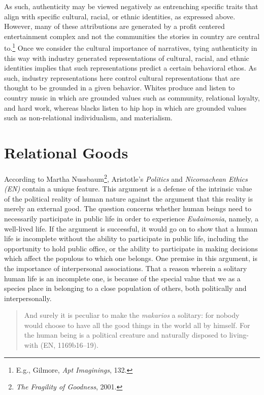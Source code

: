 \documentclass[phdthesis,12pt,final]{wuthesis}
\theoremstyle{definition}
\theoremstyle{definition}
\theoremstyle{definition}
\theoremstyle{definition}
\theoremstyle{remark}
\begin{document}
As such, authenticity may be viewed negatively as entrenching specific traits that align with specific cultural, racial, or ethnic identities, as expressed above. However, many of these attributions are generated by a profit centered entertainment complex and not the communities the stories in country are central to.\footnote{E.g., Gilmore, \emph{Apt {Imaginings}}, 132.} Once we consider the cultural importance of narratives, tying authenticity in this way with industry generated representations of cultural, racial, and ethnic identities implies that such representations predict a certain behavioral ethos. As such, industry representations here control cultural representations that are thought to be grounded in a given behavior. Whites produce and listen to country music in which are grounded values such as community, relational loyalty, and hard work, whereas blacks listen to hip hop in which are grounded values such as non-relational individualism, and materialism.

\section{Relational Goods}\label{relational-goods}

According to Martha Nussbaum\footnote{\emph{The {Fragility} of {Goodness}}, 2001.}, Aristotle's \emph{Politics} and \emph{Nicomachean Ethics (EN)} contain a unique feature. This argument is a defense of the intrinsic value of the political reality of human nature against the argument that this reality is merely an external good. The question concerns whether human beings need to necessarily participate in public life in order to experience \emph{Eudaimonia}, namely, a well-lived life. If the argument is successful, it would go on to show that a human life is incomplete without the ability to participate in public life, including the opportunity to hold public office, or the ability to participate in making decisions which affect the populous to which one belongs. One premise in this argument, is the importance of interpersonal associations. That a reason wherein a solitary human life is an incomplete one, is because of the special value that we as a species place in belonging to a close population of others, both politically and interpersonally.

\begin{quote}
And surely it is peculiar to make the \emph{makarios} a solitary: for nobody would choose to have all the good things in the world all by himself. For the human being is a political creature and naturally disposed to living-with (EN, 1169b16--19).
\end{quote}
\end{document}
